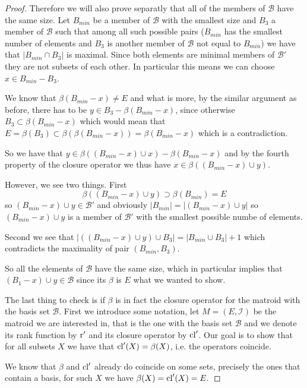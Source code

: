 \begin{proof}
Therefore we will also prove separatly that all of the members of $\mathcal{B}$ have the same size. Let $B_{min}$ be a member of $\mathcal{B}$ with the smallest size and $B_3$ a member of $\mathcal{B}$ such that among all such possible pairs ($B_{min}$ has the smallest number of elements and $B_3$ is another member of $\mathcal{B}$ not equal to $B_{min}$) we have that $|B_{min} \cap B_3|$ is maximal. Since both elements are minimal members of $\mathcal{B}'$ they are not subsets of each other. In particular this means we can choose $x \in B_{min} - B_3$. 

We know that $\beta(B_{min}-x) \neq E$ and what is more, by the similar argument as before, there has to be $y \in B_3 - \beta(B_{min} - x)$, since otherwise $B_3 \subset \beta(B_{min} - x)$ which would mean that $E = \beta(B_3)\subset \beta(\beta(B_{min}-x)) = \beta(B_{min} - x)$ which is a contradiction. 

So we have that $y \in \beta((B_{min}-x)\cup x) - \beta(B_{min} -x)$ and by the fourth property of the closure operator we thus have $x \in \beta((B_{min}-x)\cup y)$. 

However, we see two things. First
$$\beta((B_{min} - x) \cup y) \supset \beta(B_{min}) = E$$ so $(B_{min} - x) \cup y \in \mathcal{B}'$ and obviously $|B_{min}|  = |(B_{min} - x)\cup y|$ so $(B_{min} - x)\cup y$ is a member of $\mathcal{B}'$ with the smallest possible numbe of elements. 

Second we see that $|((B_{min}-x)\cup y) \cup B_3| = |B_{min}\cup B_3|+1$ which contradicts the maximality of pair $(B_{min} ,B_3)$. 

So all the elements of $\mathcal{B}$ have the same size, which in  particular implies that $(B_1 - x) \cup y \in \mathcal{B}$ since its $\beta$  is $E$ what we wanted to show.




The last thing to check is if $\beta$ is in fact the closure operator for the matroid with the basis set $\mathcal{B}.$ First we introduce some notation, let $M = (E, \mathcal{I})$ be the matroid we are interested in, that is the one with the basis set $\mathcal{B}$ and we denote its rank function by $\text{r}'$ and its closure operator by $\mathrm{cl}'$. Our goal is to show that for all subsets $X$ we have that $\mathrm{cl}'(X) = \beta(X)$, i.e. the operators coincide.

We know that $\beta$ and $\mathrm{cl}'$ already do coincide on some sets, precisely the ones that contain a basis, for such $X$ we have $\beta(X) = \mathrm{cl}'(X) = E.$


\end{proof}
